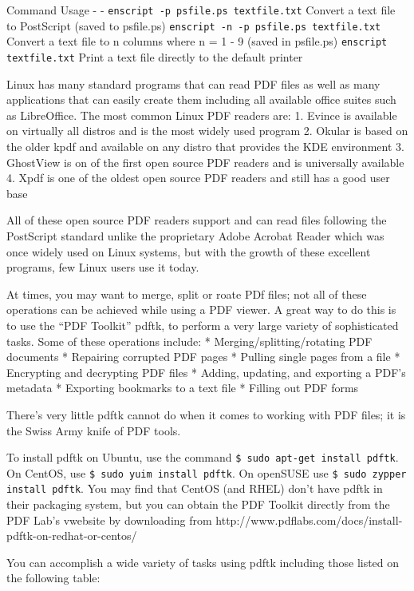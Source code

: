 Command \textbar{} Usage - \textbar{} -
\texttt{enscript -p psfile.ps textfile.txt} \textbar{} Convert a text
file to PostScript (saved to psfile.ps)
\texttt{enscript -n -p psfile.ps textfile.txt} \textbar{} Convert a text
file to n columns where n = 1 - 9 (saved in psfile.ps)
\texttt{enscript textfile.txt} \textbar{} Print a text file directly to
the default printer

Linux has many standard programs that can read PDF files as well as many
applications that can easily create them including all available office
suites such as LibreOffice. The most common Linux PDF readers are: 1.
Evince is available on virtually all distros and is the most widely used
program 2. Okular is based on the older kpdf and available on any distro
that provides the KDE environment 3. GhostView is on of the first open
source PDF readers and is universally available 4. Xpdf is one of the
oldest open source PDF readers and still has a good user base

All of these open source PDF readers support and can read files
following the PostScript standard unlike the proprietary Adobe Acrobat
Reader which was once widely used on Linux systems, but with the growth
of these excellent programs, few Linux users use it today.

At times, you may want to merge, split or roate PDf files; not all of
these operations can be achieved while using a PDF viewer. A great way
to do this is to use the ``PDF Toolkit'' pdftk, to perform a very large
variety of sophisticated tasks. Some of these operations include: *
Merging/splitting/rotating PDF documents * Repairing corrupted PDF pages
* Pulling single pages from a file * Encrypting and decrypting PDF files
* Adding, updating, and exporting a PDF's metadata * Exporting bookmarks
to a text file * Filling out PDF forms

There's very little pdftk cannot do when it comes to working with PDF
files; it is the Swiss Army knife of PDF tools.

To install pdftk on Ubuntu, use the command
\texttt{\$ sudo apt-get install pdftk}. On CentOS, use
\texttt{\$ sudo yuim install pdftk}. On openSUSE use
\texttt{\$ sudo zypper install pdftk}. You may find that CentOS (and
RHEL) don't have pdftk in their packaging system, but you can obtain the
PDF Toolkit directly from the PDF Lab's vwebsite by downloading from
http://www.pdflabs.com/docs/install-pdftk-on-redhat-or-centos/

You can accomplish a wide variety of tasks using pdftk including those
listed on the following table:

